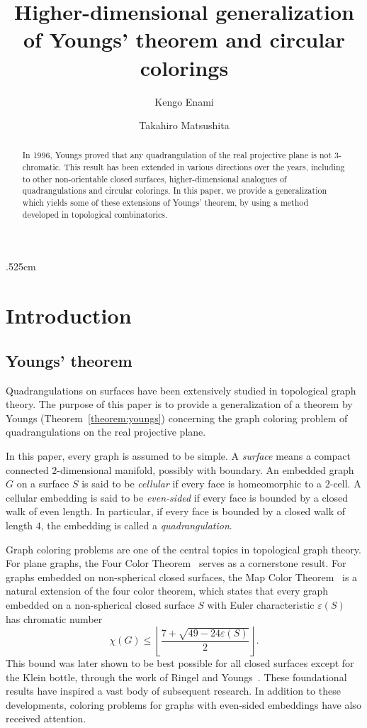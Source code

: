 \documentclass[11pt, amsfonts]{amsart}
\title[Higher-dimensional generalization of Youngs' theorem]{Higher-dimensional generalization of Youngs' theorem and circular colorings}
\author[K. Enami]{Kengo Enami}
\author[T. Matsushita]{Takahiro Matsushita}
\numberwithin{equation}{section}
\theoremstyle{definition}
\theoremstyle{remark}
\begin{document}
\baselineskip.525cm

\maketitle

\begin{abstract}
In 1996, Youngs proved that any quadrangulation of the real projective plane is not $3$-chromatic. This result has been extended in various directions over the years, including to other non-orientable closed surfaces, higher-dimensional analogues of quadrangulations
and circular colorings. In this paper, we provide a generalization which yields some of these extensions of Youngs' theorem, by using a method developed in topological combinatorics.
\end{abstract}



\section{Introduction} \label{section introduction}

\subsection{Youngs' theorem} \label{subsection background}
Quadrangulations on surfaces have been extensively studied in topological graph theory. The purpose of this paper is to provide a generalization of a theorem by Youngs (Theorem~\ref{theorem:youngs}) concerning the graph coloring problem of quadrangulations on the real projective plane.

In this paper, every graph is assumed to be simple. A \emph{surface} means a compact connected $2$-dimensional manifold, possibly with boundary. An embedded graph $G$ on a surface $S$ is said to be \emph{cellular} if every face is homeomorphic to a $2$-cell. A cellular embedding is said to be \emph{even-sided} if every face is bounded by a closed walk of even length. In particular, if every face is bounded by a closed walk of length $4$, the embedding is called a \emph{quadrangulation}.

Graph coloring problems are one of the central topics in topological graph theory. For plane graphs, the Four Color Theorem~\cite{AH1,AH2,AH3} serves as a cornerstone result. For graphs embedded on non-spherical closed surfaces, the Map Color Theorem~ \cite{Heawood} is a natural extension of the four color theorem, which states that every graph embedded on a non-spherical closed surface $S$ with Euler characteristic $\varepsilon(S)$ has chromatic number
\[ \chi(G) \leq \left\lfloor\frac{7 + \sqrt{49 - 24\varepsilon(S)}}{2} \right\rfloor.\]
This bound was later shown to be best possible for all closed surfaces except for the Klein bottle, through the work of Ringel and Youngs~\cite{RY}.
These foundational results have inspired a vast body of subsequent research. In addition to these developments, coloring problems for graphs with even-sided embeddings have also received attention.
\end{document}
